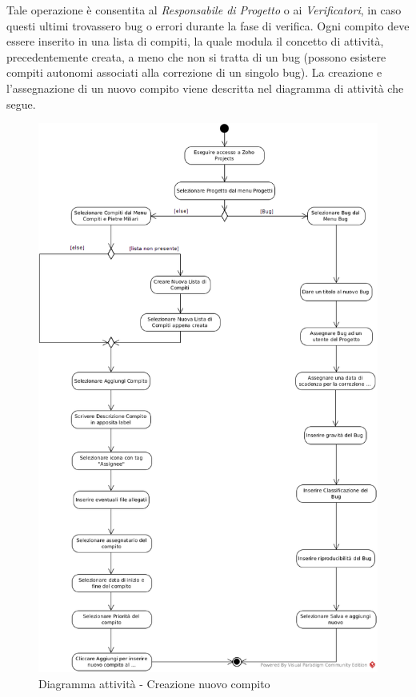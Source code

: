 Tale operazione è consentita al \textit{Responsabile di Progetto} o ai \textit{Verificatori}, in caso questi ultimi trovassero bug o errori durante la fase di verifica. Ogni compito deve essere inserito in una lista di compiti, la quale modula il concetto di attività, precedentemente creata, a meno che non si tratta di un bug (possono esistere compiti autonomi associati alla correzione di un singolo bug). La creazione e l'assegnazione di un nuovo compito viene descritta nel diagramma di attività che segue.

\begin{figure}[H]
\centering
\includegraphics[width=12cm]{CreazioneNuovoCompito.png}
\caption{Diagramma attività - Creazione nuovo compito}
\end{figure}

